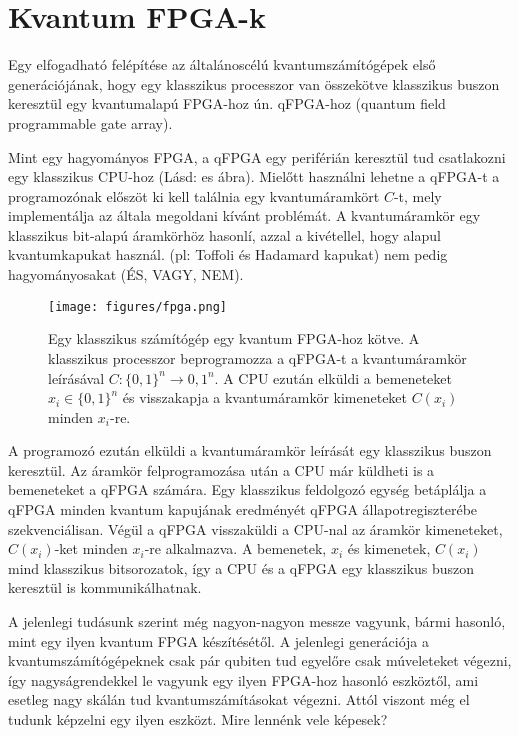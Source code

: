 \chapter{Kvantum FPGA-k}\label{sect:FPGA}
\hspace{2mm} Egy elfogadható felépítése az általánoscélú kvantumszámítógépek első generációjának, hogy egy klasszikus processzor van összekötve klasszikus buszon keresztül egy kvantumalapú FPGA-hoz ún. qFPGA-hoz (quantum field programmable gate array).

\indent Mint egy hagyományos FPGA, a qFPGA egy periférián keresztül tud csatlakozni egy klasszikus CPU-hoz (Lásd: es ábra).
Mielőtt használni lehetne a qFPGA-t a programozónak előszöt ki kell találnia egy kvantumáramkört $C$-t, mely implementálja az általa megoldani kívánt problémát.
A kvantumáramkör egy klasszikus bit-alapú áramkörhöz hasonlí, azzal a kivétellel, hogy alapul kvantumkapukat használ. (pl: Toffoli és Hadamard kapukat) nem pedig hagyományosakat (ÉS, VAGY, NEM).

\begin{figure}[!ht]
\centering
\texttt{[image: figures/fpga.png]}
\caption{Egy klasszikus számítógép egy kvantum FPGA-hoz kötve. A klasszikus processzor beprogramozza a qFPGA-t a kvantumáramkör leírásával $C:\{0,1\}^n \rightarrow {0,1}^n$. A CPU ezután elküldi a bemeneteket $x_i \in \{0,1\}^n$ és visszakapja a kvantumáramkör kimeneteket $C(x_i)$ minden $x_i$-re.}
\label{fig:fpga}
\end{figure}

\indent A programozó ezután elküldi a kvantumáramkör leírását egy klasszikus buszon keresztül. Az áramkör felprogramozása után a CPU már küldheti is a bemeneteket a qFPGA számára.
Egy klasszikus feldolgozó egység betáplálja a qFPGA minden kvantum kapujának eredményét qFPGA állapotregiszterébe szekvenciálisan.
Végül a qFPGA visszaküldi a CPU-nal az áramkör kimeneteket, $C(x_i)$-ket minden $x_i$-re alkalmazva.
A bemenetek, $x_i$ és kimenetek, $C(x_i)$ mind klasszikus bitsorozatok, így a CPU és a qFPGA egy klasszikus buszon keresztül is kommunikálhatnak.

\indent A jelenlegi tudásunk szerint még nagyon-nagyon messze vagyunk, bármi hasonló, mint egy ilyen kvantum FPGA készítésétől. A jelenlegi generációja a kvantumszámítógépeknek csak pár qubiten tud egyelőre csak múveleteket végezni, így nagyságrendekkel le vagyunk egy ilyen FPGA-hoz hasonló eszköztől, ami esetleg nagy skálán tud kvantumszámításokat végezni.
Attól viszont még el tudunk képzelni egy ilyen eszközt. Mire lennénk vele képesek?

